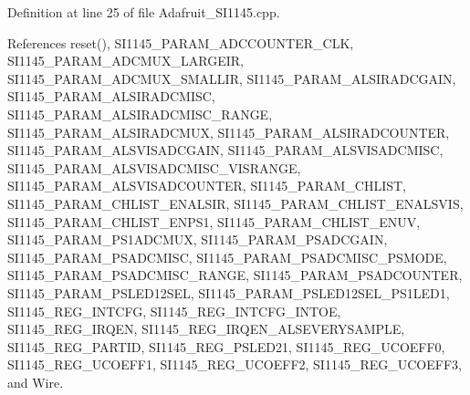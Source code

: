 Definition at line 25 of file Adafruit\+\_\+\+S\+I1145.\+cpp.



References reset(), S\+I1145\+\_\+\+P\+A\+R\+A\+M\+\_\+\+A\+D\+C\+C\+O\+U\+N\+T\+E\+R\+\_\+C\+LK, S\+I1145\+\_\+\+P\+A\+R\+A\+M\+\_\+\+A\+D\+C\+M\+U\+X\+\_\+\+L\+A\+R\+G\+E\+IR, S\+I1145\+\_\+\+P\+A\+R\+A\+M\+\_\+\+A\+D\+C\+M\+U\+X\+\_\+\+S\+M\+A\+L\+L\+IR, S\+I1145\+\_\+\+P\+A\+R\+A\+M\+\_\+\+A\+L\+S\+I\+R\+A\+D\+C\+G\+A\+IN, S\+I1145\+\_\+\+P\+A\+R\+A\+M\+\_\+\+A\+L\+S\+I\+R\+A\+D\+C\+M\+I\+SC, S\+I1145\+\_\+\+P\+A\+R\+A\+M\+\_\+\+A\+L\+S\+I\+R\+A\+D\+C\+M\+I\+S\+C\+\_\+\+R\+A\+N\+GE, S\+I1145\+\_\+\+P\+A\+R\+A\+M\+\_\+\+A\+L\+S\+I\+R\+A\+D\+C\+M\+UX, S\+I1145\+\_\+\+P\+A\+R\+A\+M\+\_\+\+A\+L\+S\+I\+R\+A\+D\+C\+O\+U\+N\+T\+ER, S\+I1145\+\_\+\+P\+A\+R\+A\+M\+\_\+\+A\+L\+S\+V\+I\+S\+A\+D\+C\+G\+A\+IN, S\+I1145\+\_\+\+P\+A\+R\+A\+M\+\_\+\+A\+L\+S\+V\+I\+S\+A\+D\+C\+M\+I\+SC, S\+I1145\+\_\+\+P\+A\+R\+A\+M\+\_\+\+A\+L\+S\+V\+I\+S\+A\+D\+C\+M\+I\+S\+C\+\_\+\+V\+I\+S\+R\+A\+N\+GE, S\+I1145\+\_\+\+P\+A\+R\+A\+M\+\_\+\+A\+L\+S\+V\+I\+S\+A\+D\+C\+O\+U\+N\+T\+ER, S\+I1145\+\_\+\+P\+A\+R\+A\+M\+\_\+\+C\+H\+L\+I\+ST, S\+I1145\+\_\+\+P\+A\+R\+A\+M\+\_\+\+C\+H\+L\+I\+S\+T\+\_\+\+E\+N\+A\+L\+S\+IR, S\+I1145\+\_\+\+P\+A\+R\+A\+M\+\_\+\+C\+H\+L\+I\+S\+T\+\_\+\+E\+N\+A\+L\+S\+V\+IS, S\+I1145\+\_\+\+P\+A\+R\+A\+M\+\_\+\+C\+H\+L\+I\+S\+T\+\_\+\+E\+N\+P\+S1, S\+I1145\+\_\+\+P\+A\+R\+A\+M\+\_\+\+C\+H\+L\+I\+S\+T\+\_\+\+E\+N\+UV, S\+I1145\+\_\+\+P\+A\+R\+A\+M\+\_\+\+P\+S1\+A\+D\+C\+M\+UX, S\+I1145\+\_\+\+P\+A\+R\+A\+M\+\_\+\+P\+S\+A\+D\+C\+G\+A\+IN, S\+I1145\+\_\+\+P\+A\+R\+A\+M\+\_\+\+P\+S\+A\+D\+C\+M\+I\+SC, S\+I1145\+\_\+\+P\+A\+R\+A\+M\+\_\+\+P\+S\+A\+D\+C\+M\+I\+S\+C\+\_\+\+P\+S\+M\+O\+DE, S\+I1145\+\_\+\+P\+A\+R\+A\+M\+\_\+\+P\+S\+A\+D\+C\+M\+I\+S\+C\+\_\+\+R\+A\+N\+GE, S\+I1145\+\_\+\+P\+A\+R\+A\+M\+\_\+\+P\+S\+A\+D\+C\+O\+U\+N\+T\+ER, S\+I1145\+\_\+\+P\+A\+R\+A\+M\+\_\+\+P\+S\+L\+E\+D12\+S\+EL, S\+I1145\+\_\+\+P\+A\+R\+A\+M\+\_\+\+P\+S\+L\+E\+D12\+S\+E\+L\+\_\+\+P\+S1\+L\+E\+D1, S\+I1145\+\_\+\+R\+E\+G\+\_\+\+I\+N\+T\+C\+FG, S\+I1145\+\_\+\+R\+E\+G\+\_\+\+I\+N\+T\+C\+F\+G\+\_\+\+I\+N\+T\+OE, S\+I1145\+\_\+\+R\+E\+G\+\_\+\+I\+R\+Q\+EN, S\+I1145\+\_\+\+R\+E\+G\+\_\+\+I\+R\+Q\+E\+N\+\_\+\+A\+L\+S\+E\+V\+E\+R\+Y\+S\+A\+M\+P\+LE, S\+I1145\+\_\+\+R\+E\+G\+\_\+\+P\+A\+R\+T\+ID, S\+I1145\+\_\+\+R\+E\+G\+\_\+\+P\+S\+L\+E\+D21, S\+I1145\+\_\+\+R\+E\+G\+\_\+\+U\+C\+O\+E\+F\+F0, S\+I1145\+\_\+\+R\+E\+G\+\_\+\+U\+C\+O\+E\+F\+F1, S\+I1145\+\_\+\+R\+E\+G\+\_\+\+U\+C\+O\+E\+F\+F2, S\+I1145\+\_\+\+R\+E\+G\+\_\+\+U\+C\+O\+E\+F\+F3, and Wire.



